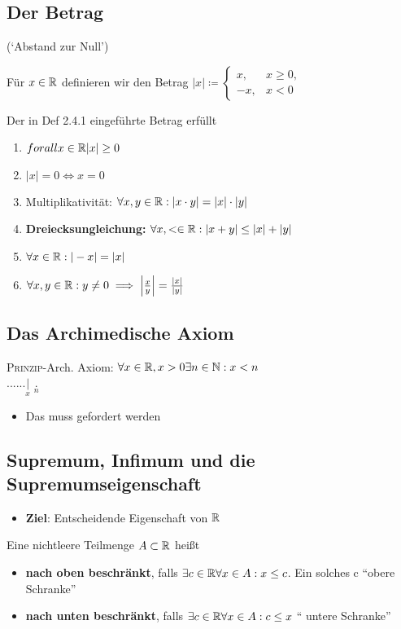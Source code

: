 \documentclass[consecutivenumbering]{gadsescript}
\begin{document}
\subsection{Der Betrag}
(`Abstand zur Null')
\begin{subdefinition}
	Für $ x \in \mathbb{R} $ definieren wir den Betrag $|x| \coloneqq \begin{cases}x,&x\geq0,\\-x,&x<0\end{cases}$
\end{subdefinition}
\begin{sublemma}
	Der in Def 2.4.1 eingeführte Betrag erfüllt
	\begin{enumerate}[label=(\roman*)]
		\item $ forall x \in \mathbb{R} |x| \geq 0$
		\item $  |x| = 0 \iff x = 0 $
		\item Multiplikativität: $ \forall x,y \in \mathbb{R} : | x\cdot y | = | x | \cdot | y | $
		\item {\color{yellow} \textbf{Dreiecksungleichung:} $ \forall x, < \in \mathbb{R}: | x + y | \leq | x | + | y |$ }
		\item $ \forall x \in \mathbb{R} : | -x| = | x | $
		\item $ \forall x, y \in \mathbb{R} :  y \neq 0 \implies \left| \frac{x}{y} \right| = \frac{|x|}{|y|} $
	\end{enumerate}
\end{sublemma}

\subsection{Das Archimedische Axiom}
\textsc{Prinzip}-Arch. Axiom: $ \forall x \in \mathbb{R}, x > 0 \exists n \in \mathbb{N} : x < n $\\
.\qquad.\qquad.\qquad.\qquad.\qquad.\quad$\underset{x}{|}$ $\underset{n}{.}$
\begin{itemize}
	\item Das muss gefordert werden
\end{itemize}

\subsection{Supremum, Infimum und die Supremumseigenschaft}
\begin{itemize}
	\item \textbf{Ziel}: Entscheidende Eigenschaft von $\mathbb{R}$
\end{itemize}
\begin{subdefinition}
	Eine nichtleere Teilmenge $ A \subset \mathbb{R} $ heißt
	\begin{itemize}
		\item \textbf{nach oben beschränkt}, falls $\exists c \in \mathbb{R} \forall x \in A: x \leq c $. Ein solches c ``obere Schranke''
		\item \textbf{nach unten beschränkt}, falls $ \exists c \in \mathbb{R} \forall x \in A: c \leq x $ `` untere Schranke''
	\end{itemize}
\end{subdefinition}
\end{document}
